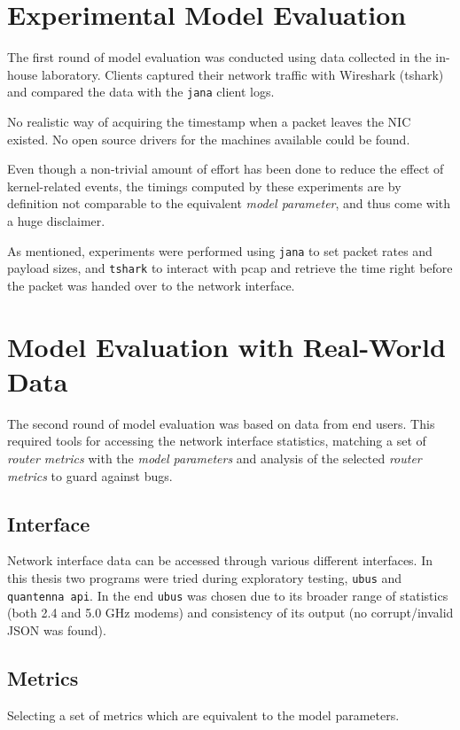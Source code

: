 \section{Experimental Model Evaluation}

The first round of model evaluation was conducted using data collected in the
in-house laboratory. Clients captured their network traffic with Wireshark
(tshark) and compared the data with the \texttt{jana} client logs.

No realistic way of acquiring the timestamp when a packet leaves the NIC
existed. No open source drivers for the machines available could be found.

Even though a non-trivial amount of effort has been done to reduce the effect of
kernel-related events, the timings computed by these experiments are by
definition not comparable to the equivalent \emph{model parameter}, and thus
come with a huge disclaimer.

As mentioned, experiments were performed using \texttt{jana} to set packet rates
and payload sizes, and \texttt{tshark} to interact with pcap and retrieve the
time right before the packet was handed over to the network interface.

\section{Model Evaluation with Real-World Data}

The second round of model evaluation was based on data from end users. This
required tools for accessing the network interface statistics, matching a set of
\emph{router metrics} with the \emph{model parameters} and analysis of the
selected \emph{router metrics} to guard against bugs.

\subsection{Interface}

Network interface data can be accessed through various different interfaces. In
this thesis two programs were tried during exploratory testing, \texttt{ubus}
and \texttt{quantenna api}. In the end \texttt{ubus} was chosen due to its
broader range of statistics (both 2.4 and 5.0 GHz modems) and consistency of its
output (no corrupt/invalid JSON was found).

\subsection{Metrics}
Selecting a set of metrics which are equivalent to the model parameters.


